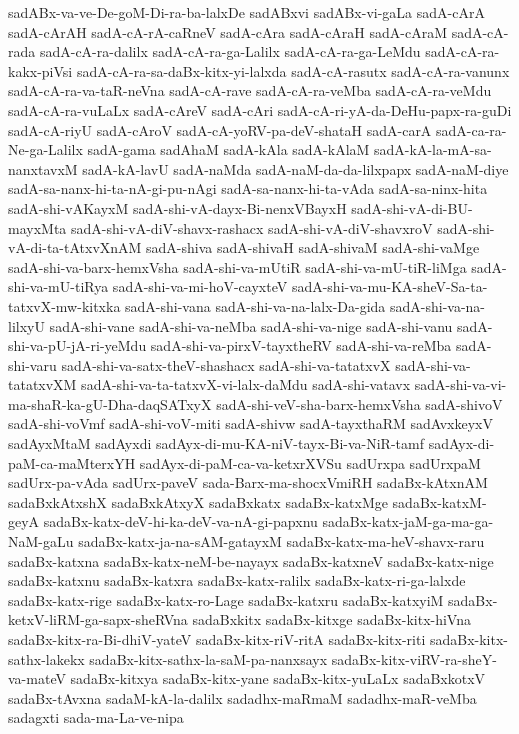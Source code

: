 {sadABx-va-ve-De-goM-Di-ra-ba-lalxDe
sadABxvi
sadABx-vi-gaLa
sadA-cArA
sadA-cArAH
sadA-cA-rA-caRneV
sadA-cAra
sadA-cAraH
sadA-cAraM
sadA-cA-rada
sadA-cA-ra-dalilx
sadA-cA-ra-ga-Lalilx
sadA-cA-ra-ga-LeMdu
sadA-cA-ra-kakx-piVsi
sadA-cA-ra-sa-daBx-kitx-yi-lalxda
sadA-cA-rasutx
sadA-cA-ra-vanunx
sadA-cA-ra-va-taR-neVna
sadA-cA-rave
sadA-cA-ra-veMba
sadA-cA-ra-veMdu
sadA-cA-ra-vuLaLx
sadA-cAreV
sadA-cAri
sadA-cA-ri-yA-da-DeHu-papx-ra-guDi
sadA-cA-riyU
sadA-cAroV
sadA-cA-yoRV-pa-deV-shataH
sadA-carA
sadA-ca-ra-Ne-ga-Lalilx
sadA-gama
sadAhaM
sadA-kAla
sadA-kAlaM
sadA-kA-la-mA-sa-nanxtavxM
sadA-kA-lavU
sadA-naMda
sadA-naM-da-da-lilxpapx
sadA-naM-diye
sadA-sa-nanx-hi-ta-nA-gi-pu-nAgi
sadA-sa-nanx-hi-ta-vAda
sadA-sa-ninx-hita
sadA-shi-vAKayxM
sadA-shi-vA-dayx-Bi-nenxVBayxH
sadA-shi-vA-di-BU-mayxMta
sadA-shi-vA-diV-shavx-rashacx
sadA-shi-vA-diV-shavxroV
sadA-shi-vA-di-ta-tAtxvXnAM
sadA-shiva
sadA-shivaH
sadA-shivaM
sadA-shi-vaMge
sadA-shi-va-barx-hemxVsha
sadA-shi-va-mUtiR
sadA-shi-va-mU-tiR-liMga
sadA-shi-va-mU-tiRya
sadA-shi-va-mi-hoV-cayxteV
sadA-shi-va-mu-KA-sheV-Sa-ta-tatxvX-mw-kitxka
sadA-shi-vana
sadA-shi-va-na-lalx-Da-gida
sadA-shi-va-na-lilxyU
sadA-shi-vane
sadA-shi-va-neMba
sadA-shi-va-nige
sadA-shi-vanu
sadA-shi-va-pU-jA-ri-yeMdu
sadA-shi-va-pirxV-tayxtheRV
sadA-shi-va-reMba
sadA-shi-varu
sadA-shi-va-satx-theV-shashacx
sadA-shi-va-tatatxvX
sadA-shi-va-tatatxvXM
sadA-shi-va-ta-tatxvX-vi-lalx-daMdu
sadA-shi-vatavx
sadA-shi-va-vi-ma-shaR-ka-gU-Dha-daqSATxyX
sadA-shi-veV-sha-barx-hemxVsha
sadA-shivoV
sadA-shi-voVmf
sadA-shi-voV-miti
sadA-shivw
sadA-tayxthaRM
sadAvxkeyxV
sadAyxMtaM
sadAyxdi
sadAyx-di-mu-KA-niV-tayx-Bi-va-NiR-tamf
sadAyx-di-paM-ca-maMterxYH
sadAyx-di-paM-ca-va-ketxrXVSu
sadUrxpa
sadUrxpaM
sadUrx-pa-vAda
sadUrx-paveV
sada-Barx-ma-shocxVmiRH
sadaBx-kAtxnAM
sadaBxkAtxshX
sadaBxkAtxyX
sadaBxkatx
sadaBx-katxMge
sadaBx-katxM-geyA
sadaBx-katx-deV-hi-ka-deV-va-nA-gi-papxnu
sadaBx-katx-jaM-ga-ma-ga-NaM-gaLu
sadaBx-katx-ja-na-sAM-gatayxM
sadaBx-katx-ma-heV-shavx-raru
sadaBx-katxna
sadaBx-katx-neM-be-nayayx
sadaBx-katxneV
sadaBx-katx-nige
sadaBx-katxnu
sadaBx-katxra
sadaBx-katx-ralilx
sadaBx-katx-ri-ga-lalxde
sadaBx-katx-rige
sadaBx-katx-ro-Lage
sadaBx-katxru
sadaBx-katxyiM
sadaBx-ketxV-liRM-ga-sapx-sheRVna
sadaBxkitx
sadaBx-kitxge
sadaBx-kitx-hiVna
sadaBx-kitx-ra-Bi-dhiV-yateV
sadaBx-kitx-riV-ritA
sadaBx-kitx-riti
sadaBx-kitx-sathx-lakekx
sadaBx-kitx-sathx-la-saM-pa-nanxsayx
sadaBx-kitx-viRV-ra-sheY-va-mateV
sadaBx-kitxya
sadaBx-kitx-yane
sadaBx-kitx-yuLaLx
sadaBxkotxV
sadaBx-tAvxna
sadaM-kA-la-dalilx
sadadhx-maRmaM
sadadhx-maR-veMba
sadagxti
sada-ma-La-ve-nipa
}
